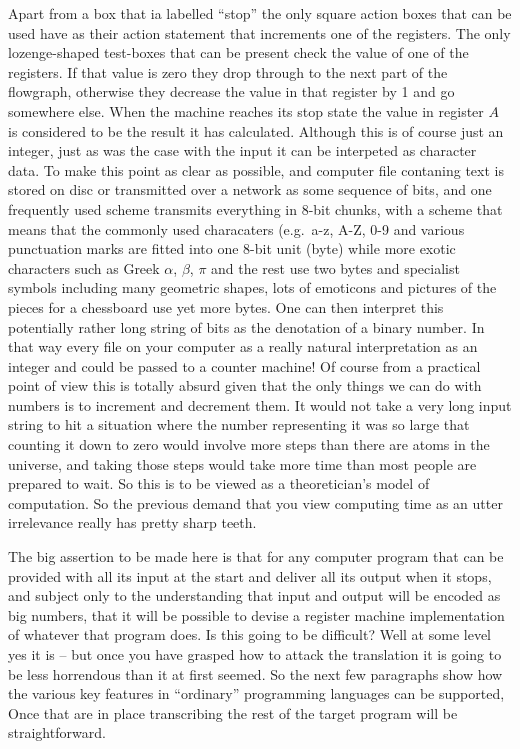 Apart from a box that ia labelled ``stop'' the only square action boxes
that can be used have as their action statement that increments one of the
registers. The only lozenge-shaped test-boxes that can be present
check the value of one of the registers. If that value is zero they
drop through to the next part of the flowgraph, otherwise they decrease the
value in that register by 1 and go somewhere else. When the machine reaches
its stop state the value in register $A$ is considered to be the result
it has calculated. Although this is of course just an integer, just as was
the case with the input it can be interpeted as character data. To make this
point as clear as possible, and computer file contaning text is stored
on disc or transmitted over a network as some sequence of bits, and one
frequently used scheme transmits everything in 8-bit chunks, with a scheme
that means that the commonly used characaters (e.g.\ a-z, A-Z, 0-9 and
various punctuation marks are fitted into one 8-bit unit (byte) while
more exotic characters such as Greek $\alpha$, $\beta$, $\pi$ and the rest
use two bytes and specialist symbols including many geometric shapes,
lots of emoticons and pictures of the pieces for a chessboard use yet
more bytes. One can then interpret this potentially rather long string
of bits as the denotation of a binary number. In that way every file
on your computer as a really natural interpretation as an integer and
could be passed to a counter machine! Of course from a practical point of
view this is totally absurd given that the only things we can do with
numbers is to increment and decrement them. It would not take a very long
input string to hit a situation where the number representing it was so
large that counting it down to zero would involve more steps than there are
atoms in the universe, and taking those steps would take more time
than most people are prepared to wait. So this is to be viewed as a
theoretician's model of computation. So the previous demand that you
view computing time as an utter irrelevance really has pretty sharp teeth.

The big assertion to be made here is that for any computer program that
can be provided with all its input at the start and deliver all its output
when it stops, and subject only to the understanding that input and output
will be encoded as big numbers, that it will be possible to devise a
register machine implementation of whatever that program does.
Is this going to be difficult? Well at some level yes it is -- but once
you have grasped how to attack the translation it is going to be less
horrendous than it at first seemed. So the next few paragraphs show
how the various key features in ``ordinary'' programming languages can
be supported, Once that are in place transcribing  the rest of the target
program will be straightforward.


